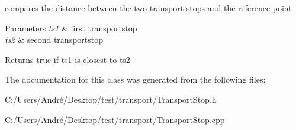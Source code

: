 compares the distance between the two transport stops and the reference point 


\begin{DoxyParams}{Parameters}
{\em ts1} & first transportstop \\
\hline
{\em ts2} & second transportstop \\
\hline
\end{DoxyParams}
\begin{DoxyReturn}{Returns}
true if ts1 is closest to ts2 
\end{DoxyReturn}


The documentation for this class was generated from the following files\+:\begin{DoxyCompactItemize}
\item 
C\+:/\+Users/\+André/\+Desktop/test/transport/Transport\+Stop.\+h\item 
C\+:/\+Users/\+André/\+Desktop/test/transport/Transport\+Stop.\+cpp\end{DoxyCompactItemize}
